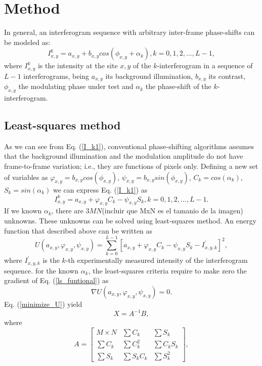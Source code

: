 \documentclass[letterpaper,12pt]{article}   %
\begin{document}
\section{Method}

In general, an interferogram sequence with arbitrary inter-frame phase-shifts can be modeled as: 
\begin{equation}\label{I_k1}
I_{x,y}^k=a_{x,y}+b_{x,y}cos(\phi_{x,y}+\alpha_k), k=0,1,2,...,L-1,
\end{equation}
where $I_{x,y}^k$ is the intensity at the site $x,y$ of the $k$-interferogram in a sequence of $L-1$ interferograms, being $a_{x,y}$ its background illumination, $b_{x,y}$ its contrast, $\phi_{x,y}$ the modulating phase under test and $\alpha_k$ the phase-shift of the $k$-interferogram. 
\subsection{Least-squares method}
As we can see from Eq. (\ref{I_k1}), conventional phase-shifting algorithms assumes that the background illumination and the modulation amplitude do not have frame-to-frame variation; i.e., they are functions of pixels only. Defining a new set of variables as $\varphi_{x,y}=b_{x,y}cos(\phi_{x,y})$, $\psi_{x,y}=b_{x,y}sin(\phi_{x,y})$, $C_k=cos(\alpha_k)$, $S_k=sin(\alpha_k)$ we can express Eq. (\ref{I_k1}) as
\begin{equation}\label{I_k2}
I_{x,y}^k=a_{x,y}+\varphi_{x,y}C_k-\psi_{x,y}S_k, k=0,1,2,...,L-1.
\end{equation}
If we known $\alpha_k$, there are $3MN$(incluir que MxN es el tamanio de la imagen) unknowns. These unknowns can be solved using least-squares method. An energy function that described above can be written as
\begin{equation}\label{ls_funtional}
U(a_{x,y},\varphi_{x,y},\psi_{x,y})=\sum_{k=0}^{L-1} [a_{x,y}+\varphi_{x,y}C_k-\psi_{x,y}S_k-I_{x,y,k}^{'}]^2,
\end{equation}
where $I_{x,y,k}^{'}$ is the $k$-th experimentally measured intensity of the interferogram sequence. for the known $\alpha_k$, the least-squares criteria require to make zero the gradient of Eq. (\ref{ls_funtional}) as
\begin{equation}\label{minimize_U}
\nabla U(a_{x,y},\varphi_{x,y},\psi_{x,y})=0.
\end{equation}
Eq. (\ref{minimize_U}) yield
\begin{equation}\label{x=AB}
X = A^{-1} B,
\end{equation}
where
\begin{equation}\label{A}
A = \left[ \begin{array}{ccc}
M\times N & \sum C_k     & \sum S_k \\
\sum C_k  & \sum C_k^2   & \sum C_k S_k \\
\sum S_k  & \sum S_k C_k & \sum S_k^2\end{array} \right],
\end{equation}
\end{document}
